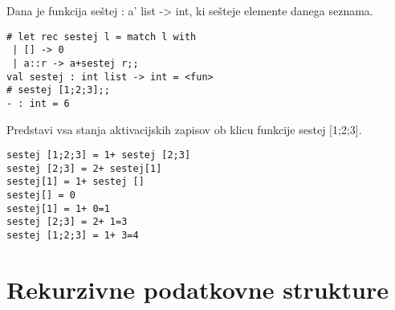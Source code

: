 \begin{ex}
Dana je funkcija se\v stej : a' list -> int, ki se\v steje elemente danega seznama.

\begin{verbatim}
# let rec sestej l = match l with
 | [] -> 0
 | a::r -> a+sestej r;; 
val sestej : int list -> int = <fun> 
# sestej [1;2;3];; 
- : int = 6 

\end{verbatim}
Predstavi vsa stanja aktivacijskih zapisov ob klicu funkcije sestej [1;2;3].

\begin{sol}
\begin{verbatim}
sestej [1;2;3] = 1+ sestej [2;3]
sestej [2;3] = 2+ sestej[1]
sestej[1] = 1+ sestej []
sestej[] = 0
sestej[1] = 1+ 0=1
sestej [2;3] = 2+ 1=3
sestej [1;2;3] = 1+ 3=4
\end{verbatim}
\end{sol}

\end{ex}

\section{Rekurzivne podatkovne strukture}


